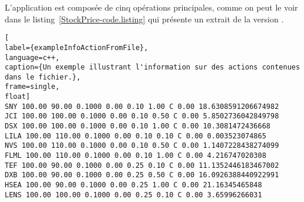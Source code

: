 L'application  est compos\'ee de cinq op\'erations principales, comme on peut le voir dans le listing~\ref{StockPrice-code.listing} qui présente un extrait de la version \ppff.

\begin{lstlisting}[
label={exampleInfoActionFromFile},
language=c++,
caption={Un exemple illustrant l'information sur des actions contenues dans le fichier.},
frame=single,
float]
SNY 100.00 90.00 0.1000 0.00 0.10 1.00 C 0.00 18.6308591206674982
JCI 100.00 100.00 0.1000 0.00 0.10 0.50 C 0.00 5.8502736042849798
DSX 100.00 100.00 0.1000 0.00 0.10 1.00 C 0.00 10.3081472436668
LILA 100.00 110.00 0.1000 0.00 0.10 0.10 C 0.00 0.003523074865
NVS 100.00 110.00 0.1000 0.00 0.10 0.50 C 0.00 1.1407228438274099
FLML 100.00 110.00 0.1000 0.00 0.10 1.00 C 0.00 4.216747020308
TEF 100.00 90.00 0.1000 0.00 0.25 0.10 C 0.00 11.1352446183467002
DXB 100.00 90.00 0.1000 0.00 0.25 0.50 C 0.00 16.0926388440922991
HSEA 100.00 90.00 0.1000 0.00 0.25 1.00 C 0.00 21.16345465848
LENS 100.00 100.00 0.1000 0.00 0.25 0.10 C 0.00 3.65996266031
\end{lstlisting}




